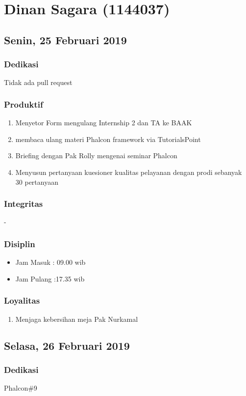 \chapter{Dinan Sagara (1144037)}

\section{Senin, 25 Februari 2019}
\subsection{Dedikasi}
Tidak ada pull request
\subsection{Produktif}
\begin{enumerate}
\item Menyetor Form mengulang Internship 2 dan TA ke BAAK
\item membaca ulang materi Phalcon framework via TutorialsPoint
\item Briefing dengan Pak Rolly mengenai seminar Phalcon
\item Menyusun pertanyaan kuesioner kualitas pelayanan dengan prodi sebanyak 30 pertanyaan
\end{enumerate}
\subsection{Integritas}
-
\subsection{Disiplin}
\begin{itemize}
\item Jam Masuk : 09.00 wib
\item Jam Pulang :17.35 wib
\end{itemize}
\subsection{Loyalitas}
\begin{enumerate}
\item Menjaga kebersihan meja Pak Nurkamal
\end{enumerate}

\section{Selasa, 26 Februari 2019}
\subsection{Dedikasi}
Phalcon\#9
